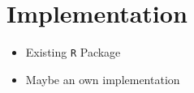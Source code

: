 \chapter{Implementation}

\begin{itemize}
  \item Existing \texttt{R} Package
  \item Maybe an own implementation
\end{itemize}